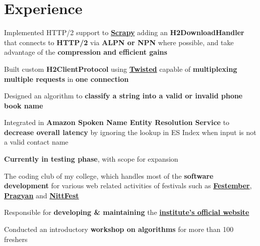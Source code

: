 \documentclass[]{deedy-resume-openfont}
\begin{document}
\hfill
\begin{minipage}[t]{0.69\textwidth}

\section{Experience}
\vspace{\topsep}
\begin{tightemize}
\item Implemented HTTP/2 support to \textbf{\href{https://github.com/scrapy/scrapy}{Scrapy}} adding an \textbf{H2DownloadHandler} that connects to \textbf{HTTP/2} via \textbf{ALPN or NPN} where possible, and take advantage of the \textbf{compression and efficient gains} \item Built custom \textbf{H2ClientProtocol} using \textbf{\href{https://twistedmatrix.com/trac/}{Twisted}} capable of \textbf{multiplexing multiple requests} in \textbf{one connection}
\end{tightemize}
\sectionsep

\begin{tightemize}
\item Designed an algorithm to \textbf{classify a string into a valid or invalid phone book name} \item Integrated in \textbf{Amazon Spoken Name Entity Resolution Service} to \textbf{decrease overall latency} by ignoring the lookup in ES Index when input is not a valid contact name \item \textbf{Currently in testing phase}, with scope for expansion
\end{tightemize}
\sectionsep

\begin{tightemize}
\item The coding club of my college, which handles most of the \textbf{software development} for various web related activities of festivals such as \href{https://festember.com}{\textbf{Festember}}, \href{https://www.pragyan.org}{\textbf{Pragyan}} and \href{https://www.nittfest.in/}{\textbf{NittFest}} \item Responsible for \textbf{developing \& maintaining} the \href{https://www.nitt.edu/}{\textbf{institute's official website}} \item Conducted an introductory \textbf{workshop on algorithms} for more than 100 freshers
\end{tightemize}
\sectionsep


\end{minipage}
\end{document}
